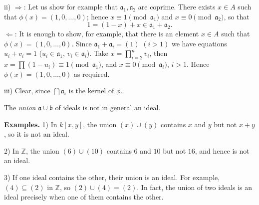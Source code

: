 ii) $\Rightarrow$: Let us show for example that $\mathfrak a_1,\mathfrak a_2$ are coprime.  There exists $x\in A$
such that $\phi(x)=(1,0,\ldots,0)$; hence $x\equiv1\pmod{\mathfrak a_1}$ and $x\equiv0\pmod{\mathfrak a_2}$, so
that
\[
1=(1-x)+x\in\mathfrak a_1+\mathfrak a_2.
\]
$\Leftarrow$: It is enough to show, for example, that there is an element $x\in A$ such that
$\phi(x)=(1,0,\ldots,0)$.  Since $\mathfrak a_1+\mathfrak a_i=(1)$ $(i>1)$ we have equations $u_i+v_i=1$
($u_i\in\mathfrak a_1$, $v_i\in\mathfrak a_i$).  Take $x=\prod_{i=2}^n v_i$, then $x=\prod(1-u_i)\equiv1\pmod{\mathfrak a_1}$, and
$x\equiv0\pmod{\mathfrak a_i}$, $i>1$.  Hence $\phi(x)=(1,0,\ldots,0)$ as required.

iii) Clear, since $\bigcap\mathfrak a_i$ is the kernel of $\phi$.\proofbox

The \emph{union} $\mathfrak a\cup\mathfrak b$ of ideals is not in general an ideal.

\textline
\noindent\textbf{Examples.} 1) In $k[x,y]$, the union $(x)\cup(y)$ contains
$x$ and $y$ but not $x+y$, so it is not an ideal.

2) In $\mathbb Z$, the union $(6)\cup(10)$ contains $6$ and $10$ but not $16$,
and hence is not an ideal.

3) If one ideal contains the other, their union is an ideal.  For example,
$(4)\subseteq(2)$ in $\mathbb Z$, so $(2)\cup(4)=(2)$.  In fact, the union of
two ideals is an ideal precisely when one of them contains the other.
\textline
